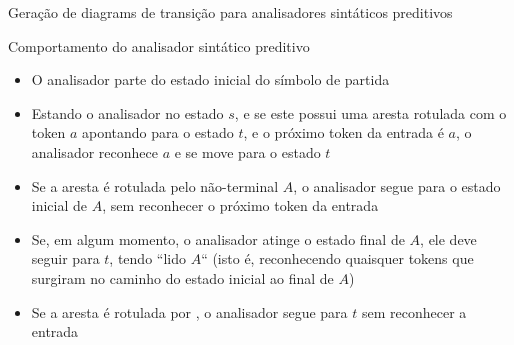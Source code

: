 \begin{frame}[fragile]{Geração de diagrams de transição para analisadores sintáticos preditivos}

    \begin{algorithmic}[1]

        \vspace{0.2in}

        \Statex
            \EndFor
        \EndFor
    \end{algorithmic}

\end{frame}

\begin{frame}[fragile]{Comportamento do analisador sintático preditivo}

    \begin{itemize}
        \item O analisador parte do estado inicial do símbolo de partida
        \pause

        \item Estando o analisador no estado $s$, e se este possui uma aresta rotulada com o token $a$ apontando para o estado $t$, e o próximo token da entrada
            é $a$, o analisador reconhece $a$ e se move para o estado $t$
        \pause

        \item Se a aresta é rotulada pelo não-terminal $A$, o analisador segue para o estado inicial de $A$, sem reconhecer o próximo token da entrada
        \pause

        \item Se, em algum momento, o analisador atinge o estado final de $A$, ele deve seguir para $t$, tendo ``lido $A$`` (isto é, reconhecendo quaisquer
            tokens que surgiram no caminho do estado inicial ao final de $A$)
        \pause

        \item Se a aresta é rotulada por , o analisador segue para $t$ sem reconhecer a entrada
    \end{itemize}

\end{frame}

